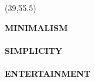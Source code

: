 \documentclass[hyperref={pdfpagelabels=false}]{beamer}
\begin{document}
\begin{frame}
\begin{textblock}{39}
\begin{blankbox}
		\end{blankbox}
	\end{textblock}

	\begin{textblock}{20}(39,55.5)
		\begin{blankbox}
			{\Huge \textbf {\uppercase{Minimalism}}} \\\hspace*{\fill} \\
			{\Huge \textbf {\uppercase{Simplicity}}} \\\hspace*{\fill} \\
			{\Huge \textbf {\scshape{ENTERTAINMENT}}} \\\hspace*{\fill} \\
		\end{blankbox}
	\end{textblock}





\end{frame}
\end{document}
